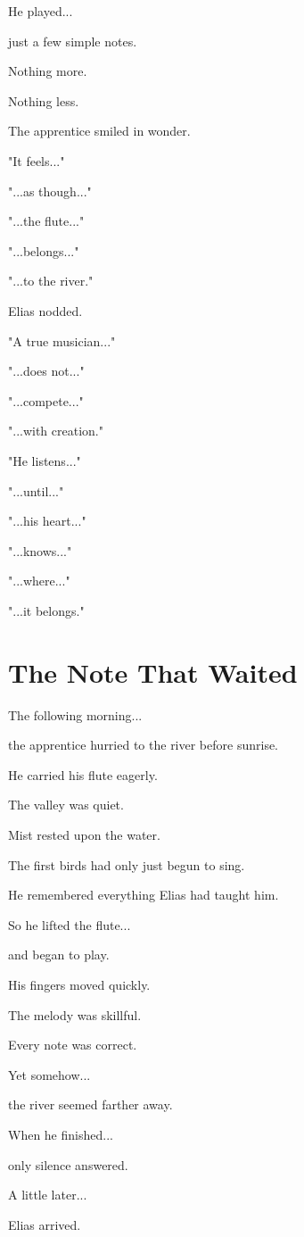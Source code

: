 \documentclass[12pt,openany]{book}
\begin{document}
He played...

just a few simple notes.

Nothing more.

Nothing less.

The apprentice smiled in wonder.

"It feels..."

"...as though..."

"...the flute..."

"...belongs..."

"...to the river."

Elias nodded.

"A true musician..."

"...does not..."

"...compete..."

"...with creation."

"He listens..."

"...until..."

"...his heart..."

"...knows..."

"...where..."

"...it belongs."
\section*{The Note That Waited}

The following morning...

the apprentice hurried to the river before sunrise.

He carried his flute eagerly.

The valley was quiet.

Mist rested upon the water.

The first birds had only just begun to sing.

He remembered everything Elias had taught him.

So he lifted the flute...

and began to play.

His fingers moved quickly.

The melody was skillful.

Every note was correct.

Yet somehow...

the river seemed farther away.

When he finished...

only silence answered.

A little later...

Elias arrived.
\end{document}
